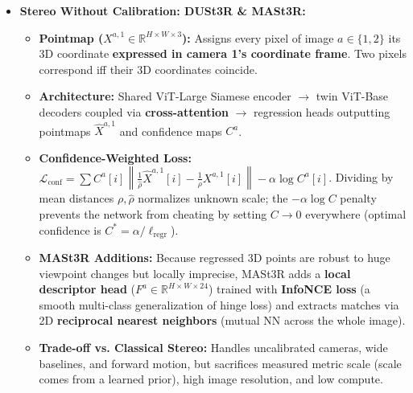 \documentclass[11pt,a4paper]{article}
\theoremstyle{definition}
\theoremstyle{plain}
\theoremstyle{remark}
\begin{document}
\begin{itemize}
\begin{itemize}
        \item \textbf{DispNet:} End-to-end 2D encoder-decoder with a 1D correlation layer; pretrained on synthetic data (FlyingThings3D).
        \item \textbf{GC-Net:} Builds a 4D cost volume ($H \times W \times D \times F$), regularizes with 3D convolutions, and extracts sub-pixel disparity via differentiable \textbf{Soft Argmin}: $\hat{d} = \sum_{d=0}^{d_{\max}} d \cdot \text{softmax}(-c_\theta(d))$. \textbf{Flaw:} High 3D memory cost, and bimodal cost curves at occlusion edges average out to flying pixels between modes.
    \end{itemize}
    \item \textbf{Stereo Without Calibration: DUSt3R \& MASt3R:}
    \begin{itemize}
        \item \textbf{Pointmap ($X^{a,1} \in \mathbb{R}^{H \times W \times 3}$):} Assigns every pixel of image $a \in \{1,2\}$ its 3D coordinate \textbf{expressed in camera 1's coordinate frame}. Two pixels correspond iff their 3D coordinates coincide.
        \item \textbf{Architecture:} Shared ViT-Large Siamese encoder $\rightarrow$ twin ViT-Base decoders coupled via \textbf{cross-attention} $\rightarrow$ regression heads outputting pointmaps $\hat{X}^{a,1}$ and confidence maps $C^a$.
        \item \textbf{Confidence-Weighted Loss:} $\mathcal{L}_{\text{conf}} = \sum C^a[i] \left\|\frac{1}{\hat{\rho}}\hat{X}^{a,1}[i] - \frac{1}{\rho}X^{a,1}[i]\right\| - \alpha \log C^a[i]$. Dividing by mean distances $\rho, \hat{\rho}$ normalizes unknown scale; the $-\alpha\log C$ penalty prevents the network from cheating by setting $C \to 0$ everywhere (optimal confidence is $C^* = \alpha / \ell_{\text{regr}}$).
        \item \textbf{MASt3R Additions:} Because regressed 3D points are robust to huge viewpoint changes but locally imprecise, MASt3R adds a \textbf{local descriptor head} ($F^a \in \mathbb{R}^{H \times W \times 24}$) trained with \textbf{InfoNCE loss} (a smooth multi-class generalization of hinge loss) and extracts matches via 2D \textbf{reciprocal nearest neighbors} (mutual NN across the whole image).
        \item \textbf{Trade-off vs. Classical Stereo:} Handles uncalibrated cameras, wide baselines, and forward motion, but sacrifices measured metric scale (scale comes from a learned prior), high image resolution, and low compute.
    \end{itemize}
\end{itemize}
\end{document}
